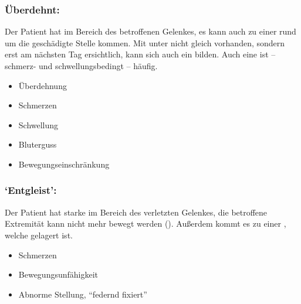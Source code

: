 \subsubsection{Überdehnt: }
\label{topic:verstauchung-eh}

{%
Der Patient hat  im Bereich des betroffenen Gelenkes, es
kann auch zu einer  rund um die geschädigte Stelle kommen. Mit
unter nicht gleich vorhanden, sondern erst am nächsten Tag ersichtlich,
kann sich auch ein  bilden. Auch eine  ist -- schmerz- und schwellungsbedingt -- häufig. 

}{
\begin{itemize}
  \item Überdehnung
  \item Schmerzen
  \item Schwellung
  \item Bluterguss
  \item Bewegungseinschränkung
\end{itemize}
}{}{}{}







\subsubsection{\enquote*{Entgleist}: }
\label{topic:verrenkung-eh}


{%
Der Patient hat starke  im Bereich des verletzten Gelenkes,
die betroffene Extremität kann nicht mehr bewegt werden
(). Außerdem kommt es zu einer , welche  gelagert ist. 
}{
\begin{itemize}
    \item Schmerzen
    \item Bewegungsunfähigkeit
    \item Abnorme Stellung, \enquote{federnd fixiert}
\end{itemize}
}{}{}{}

